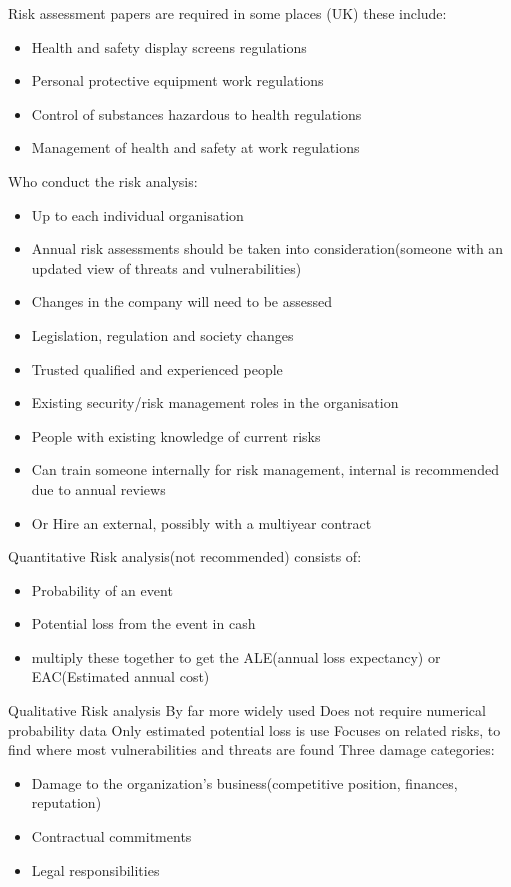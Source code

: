 Risk assessment papers are required in some places (UK) these include:
\begin{itemize}
    \item Health and safety display screens regulations
    \item Personal protective equipment work regulations
    \item Control of substances hazardous to health regulations
    \item Management of health and safety at work regulations
\end{itemize}
Who conduct the risk analysis:
\begin{itemize}
    \item Up to each individual organisation
    \item Annual risk assessments should be taken into consideration(someone with an updated view of threats and vulnerabilities)
    \item Changes in the company will need to be assessed
    \item Legislation, regulation and society changes
    \item Trusted qualified and experienced people
    \item Existing security/risk management roles in the organisation
    \item People with existing knowledge of current risks
    \item Can train someone internally for risk management, internal is recommended due to annual reviews
    \item Or Hire an external, possibly with a multiyear contract
\end{itemize}

Quantitative Risk analysis(not recommended) consists of:
\begin{itemize}
    \item Probability of an event 
    \item Potential loss from the event in cash
    \item multiply these together to get the ALE(annual loss expectancy) or EAC(Estimated annual cost)
\end{itemize}

Qualitative Risk analysis By far more widely used Does not require numerical probability data
Only estimated potential loss is use Focuses on related risks, to find where most vulnerabilities and threats are found
Three damage categories:
\begin{itemize}
    \item Damage to the organization's business(competitive position, finances, reputation)
    \item Contractual commitments
    \item Legal responsibilities
\end{itemize}

